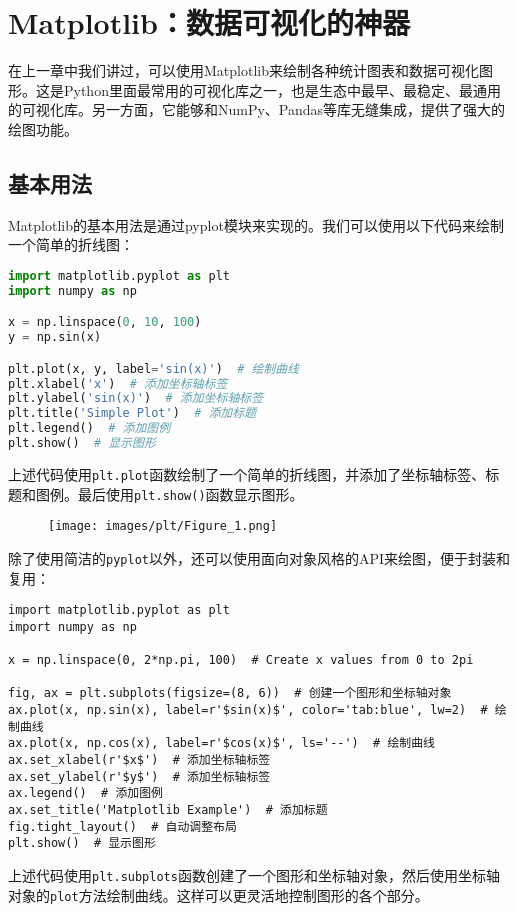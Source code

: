 \documentclass[../main.tex]{subfiles}
\begin{document}
\section{Matplotlib：数据可视化的神器}

在上一章中我们讲过，可以使用Matplotlib来绘制各种统计图表和数据可视化图形。这是Python里面最常用的可视化库之一，也是生态中最早、最稳定、最通用的可视化库。另一方面，它能够和NumPy、Pandas等库无缝集成，提供了强大的绘图功能。

\subsection{基本用法}

Matplotlib的基本用法是通过pyplot模块来实现的。我们可以使用以下代码来绘制一个简单的折线图：
\begin{lstlisting}[language=python]
import matplotlib.pyplot as plt
import numpy as np

x = np.linspace(0, 10, 100)
y = np.sin(x)

plt.plot(x, y, label='sin(x)')  # 绘制曲线
plt.xlabel('x')  # 添加坐标轴标签
plt.ylabel('sin(x)')  # 添加坐标轴标签
plt.title('Simple Plot')  # 添加标题
plt.legend()  # 添加图例
plt.show()  # 显示图形
\end{lstlisting}
上述代码使用\texttt{plt.plot}函数绘制了一个简单的折线图，并添加了坐标轴标签、标题和图例。最后使用\texttt{plt.show()}函数显示图形。

\begin{figure}[ht]
  \centering
  \texttt{[image: images/plt/Figure\_1.png]}
\end{figure}

除了使用简洁的\texttt{pyplot}以外，还可以使用面向对象风格的API来绘图，便于封装和复用：

\begin{lstlisting}
import matplotlib.pyplot as plt
import numpy as np

x = np.linspace(0, 2*np.pi, 100)  # Create x values from 0 to 2pi

fig, ax = plt.subplots(figsize=(8, 6))  # 创建一个图形和坐标轴对象
ax.plot(x, np.sin(x), label=r'$sin(x)$', color='tab:blue', lw=2)  # 绘制曲线
ax.plot(x, np.cos(x), label=r'$cos(x)$', ls='--')  # 绘制曲线
ax.set_xlabel(r'$x$')  # 添加坐标轴标签
ax.set_ylabel(r'$y$')  # 添加坐标轴标签
ax.legend()  # 添加图例
ax.set_title('Matplotlib Example')  # 添加标题
fig.tight_layout()  # 自动调整布局
plt.show()  # 显示图形
\end{lstlisting}
上述代码使用\texttt{plt.subplots}函数创建了一个图形和坐标轴对象，然后使用坐标轴对象的\texttt{plot}方法绘制曲线。这样可以更灵活地控制图形的各个部分。
\end{document}
